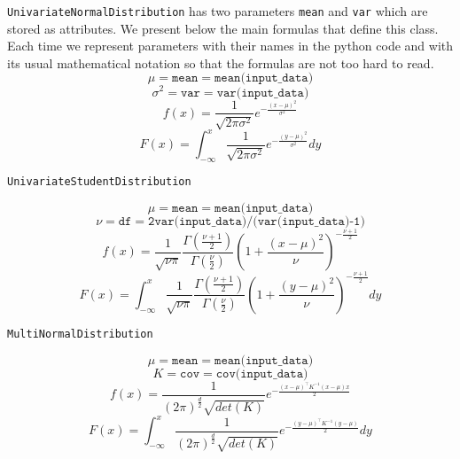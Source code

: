 \documentclass{article}
\begin{document}
  \texttt{UnivariateNormalDistribution} has two parameters \texttt{mean} and \texttt{var} which are stored as attributes. We present below the main formulas that define this class. Each time we represent parameters with their names in the python code and with its usual mathematical notation so that the formulas are not too hard to read.
  	\begin{equation*}
  	\mu = \texttt{mean} =  \texttt{mean(input\_data})
  	\end{equation*}
  	\begin{equation*}
  	\sigma^2 = \texttt{var} = \texttt{var(input\_data})
  	\end{equation*}
  	\begin{equation*}
  	f(x) = \frac{1}{\sqrt{2\pi \sigma^2}}e^{-\frac{(x-\mu)^2}{\sigma^2}}
  	\end{equation*}
  	\begin{equation*}
  	F(x) = \int_{-\infty}^x \frac{1}{\sqrt{2\pi\sigma^2}}e^{-\frac{(y-\mu)^2}{\sigma^2}}dy
  	\end{equation*}

  	\texttt{UnivariateStudentDistribution}

  	\begin{equation*}
  	\mu = \texttt{mean} = \texttt{mean(input\_data)}
  	\end{equation*}
  	\begin{equation*}
  	\nu = \texttt{df} = \texttt{2var(input\_data)/(var(input\_data)-1)}
  	\end{equation*}
  	\begin{equation*}
  	f(x) = \frac{1}{\sqrt{\nu\pi}}\frac{\Gamma(\frac{\nu+1}{2})}{\Gamma(\frac{\nu}{2})}\left(1+\frac{(x-\mu)^2}{\nu}\right)^{-\frac{\nu+1}{2}}
  	\end{equation*}
  	\begin{equation*}
  	F(x) = \int_{-\infty}^x \frac{1}{\sqrt{\nu\pi}}\frac{\Gamma(\frac{\nu+1}{2})}{\Gamma(\frac{\nu}{2})}\left(1+\frac{(y-\mu)^2}{\nu}\right)^{-\frac{\nu+1}{2}}dy
  	\end{equation*}


	 \texttt{MultiNormalDistribution}

  	\begin{equation*}
  	\mu = \texttt{mean} = \texttt{mean(input\_data)}
  	\end{equation*}
  	\begin{equation*}
  	K = \texttt{cov} = \texttt{cov(input\_data)}
  	\end{equation*}
  	\begin{equation*}
  	f(x) = \frac{1}{(2\pi)^{\frac{d}{2}}\sqrt{det(K)}}e^{-\frac{(x-\mu)^\top K^{-1} (x-\mu)x}{2}}
  	\end{equation*}
  	\begin{equation*}
  	F(x) = \int_{-\infty}^x \frac{1}{(2\pi)^{\frac{d}{2}}\sqrt{det(K)}}e^{-\frac{(y-\mu)^\top K^{-1} (y-\mu)}{2}}dy
  	\end{equation*}
\end{document}
